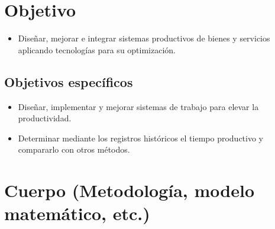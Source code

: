     \section{Objetivo}
    
    \begin{itemize}
    \item Diseñar, mejorar e integrar sistemas productivos de bienes y servicios  aplicando tecnologías para su optimización.
    \end{itemize}
    
    \subsection{Objetivos específicos }
    
    \begin{itemize}
    \item Diseñar, implementar y mejorar sistemas de trabajo para elevar la productividad.
    \item Determinar mediante los registros históricos el tiempo productivo y compararlo con otros métodos.
    \end{itemize}
    
    \section{Cuerpo (Metodología, modelo matemático, etc.)}
    
